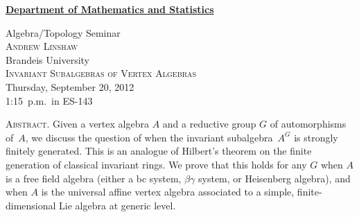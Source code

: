 \documentclass[12pt]{article}
\begin{document}
\noindent\hspace{-28pt}\raisebox{-19pt}{\XeTeXpicfile UAlogo.jpg scaled 340}%
\hfill\textsf{\textbf{\footnotesize\href{http://www.albany.edu/math/}{Department of Mathematics and Statistics}}}\bigskip\bigskip

\begin{center}\Large
  \textsf{\huge Algebra/Topology Seminar}\\[2.5\bigskipamount]
  \textsc{\LARGE Andrew Linshaw}\\
  Brandeis University\\[1.5\bigskipamount]
  \textsc{\LARGE Invariant Subalgebras of Vertex Algebras}\\[2\bigskipamount]
  Thursday, September 20, 2012\\1:15~p.m.\ in ES-143\\[3\bigskipamount]
\end{center}

\noindent\large\textsc{Abstract.}
Given a vertex algebra $A$ and a reductive group $G$ of automorphisms of~$A$, we discuss the question of when the invariant subalgebra~$A^G$ is strongly finitely generated.
This is an analogue of Hilbert's theorem on the finite generation of classical invariant rings.
We prove that this holds for any $G$ when $A$ is a free field algebra (either a bc system, $\beta\gamma$ system, or Heisenberg algebra), and when $A$ is the universal affine vertex algebra associated to a simple, finite-dimensional Lie algebra at generic level.
\end{document}
